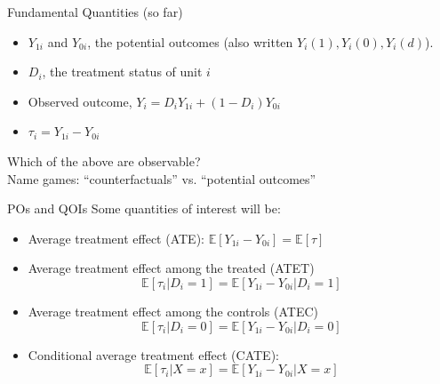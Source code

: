 \documentclass[xcolor=dvipsnames]{beamer}
\newcommand\E{\mathbb{E}}
\begin{document}
\begin{frame}{Fundamental Quantities (so far)}
\small
\begin{itemize}
\item $Y_{1i}$ and $Y_{0i}$, the potential outcomes  (also written $Y_i(1), Y_i(0), Y_i(d)$).
\medskip
\item $D_i$, the treatment status of unit $i$
\medskip
\item  Observed outcome, $Y_i=D_i Y_{1i}+(1-D_i)Y_{0i}$
\medskip
\item $\tau_i= Y_{1i}-Y_{0i}$
\end{itemize}
\medskip
{} Which of the above are observable? \\
\medskip
{} Name games: ``counterfactuals'' vs. ``potential outcomes''
\end{frame}

\begin{frame}{POs and QOIs}
  Some quantities of interest will be:\\
\small
\begin{itemize}
\item<2-> Average treatment effect (ATE): $\E[Y_{1i}-Y_{0i}]=\E[\tau]$
\medskip
\item<3-> Average treatment effect among the treated (ATET)
\medskip
\[\E[\tau_i|D_i=1]=\E[Y_{1i}-Y_{0i}|D_i=1]\]
\item<4-> Average treatment effect among the controls (ATEC)
\medskip
\[\E[\tau_i|D_i=0]=\E[Y_{1i}-Y_{0i}|D_i=0]\]

\item<5-> Conditional average treatment effect (CATE):
\medskip
\[\E[\tau_i|X=x]=\E[Y_{1i}-Y_{0i}|X=x]\]

\end{itemize}
\end{frame}
\end{document}
